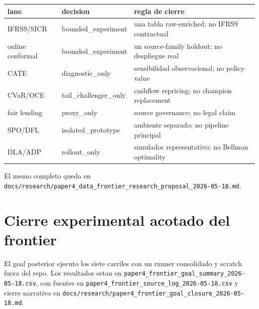 \documentclass[
  spanish,
  11pt,
  letterpaper,
]{scrbook}
\newcounter{none} %
\theoremstyle{plain}
\theoremstyle{remark}
\begin{document}
{\def\LTcaptype{none} %
\begin{longtable}[]{@{}
  >{\raggedright\arraybackslash}p{}
  >{\raggedright\arraybackslash}p{}
  >{\raggedright\arraybackslash}p{}@{}}
\toprule\noalign{}
\begin{minipage}[b]{\linewidth}\raggedright
lane
\end{minipage} & \begin{minipage}[b]{\linewidth}\raggedright
decision
\end{minipage} & \begin{minipage}[b]{\linewidth}\raggedright
regla de cierre
\end{minipage} \\
\midrule\noalign{}
\endhead
\bottomrule\noalign{}
\endlastfoot
IFRS9/SICR & bounded\_experiment & una tabla raw-enriched; no IFRS9
contractual \\
online conformal & bounded\_experiment & un source-family holdout; no
despliegue real \\
CATE & diagnostic\_only & sensibilidad observacional; no policy value \\
CVaR/OCE & tail\_challenger\_only & cashflow repricing; no champion
replacement \\
fair lending & proxy\_only & source governance; no legal claim \\
SPO/DFL & isolated\_prototype & ambiente separado; no pipeline
principal \\
DLA/ADP & rollout\_only & simulador representativo; no Bellman
optimality \\
\end{longtable}
}

El memo completo queda en
\texttt{docs/research/paper4\_data\_frontier\_research\_proposal\_2026-05-18.md}.

\section{Cierre experimental acotado del
frontier}\label{cierre-experimental-acotado-del-frontier}

El goal posterior ejecuto los siete carriles con un runner consolidado y
scratch fuera del repo. Los resultados estan en
\texttt{paper4\_frontier\_goal\_summary\_2026-05-18.csv}, con fuentes en
\texttt{paper4\_frontier\_source\_log\_2026-05-18.csv} y cierre
narrativo en
\texttt{docs/research/paper4\_frontier\_goal\_closure\_2026-05-18.md}.
\end{document}
